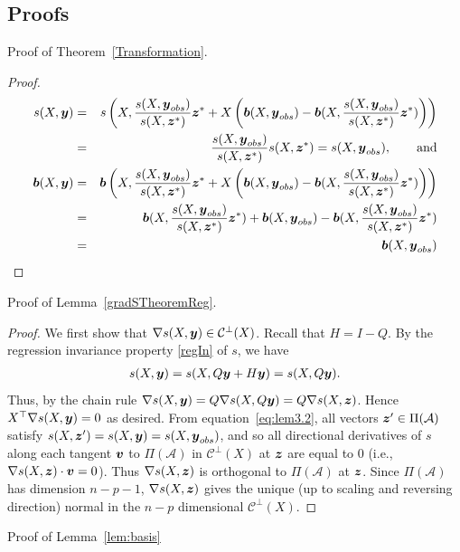 \documentclass[11pt]{article}
\newcommand{\by}{\mbox{\boldmath $y$}}
\newcommand{\bz}{\mbox{\boldmath $z$}}
\newcommand{\bv}{\mbox{\boldmath $v$}}
\newcommand{\bb}{\mbox{\boldmath $b$}}
\newcommand{\mc}{\mathcal}
\begin{document}
\subsection{Proofs}
\noindent

Proof of Theorem~\ref{Transformation}.  
\begin{proof} 
\begin{eqnarray}
 s(X,\by) & = & s\left(X,\frac{s(X,\by_{obs})}{s(X,\bz^*)}\bz^* + X\left(\bb(X,\by_{obs}) - \bb(X,\frac{s(X,\by_{obs})}{s(X,\bz^*)}\bz^*)\right)\right) \\
& = & \frac{s(X,\by_{obs})}{s(X,\bz^*)} s(X, \bz^*)= s(X,\by_{obs}) , \qquad \mbox{and} \\
 \bb(X,\by) & = & \bb\left(X,\frac{s(X,\by_{obs})}{s(X,\bz^*)}\bz^* + X\left(\bb(X,\by_{obs}) - \bb(X,\frac{s(X,\by_{obs})}{s(X,\bz^*)}\bz^*)\right)\right) \\
 & = & \bb(X,\frac{s(X,\by_{obs})}{s(X,\bz^*)}\bz^*) + \bb(X,\by_{obs}) - \bb(X,\frac{s(X,\by_{obs})}{s(X,\bz^*)}\bz^*) \\ &=& \bb(X,\by_{obs})
\end{eqnarray}
\end{proof}

\noindent
Proof of Lemma~\ref{gradSTheoremReg}.
\begin{proof}
We first show that $\nabla s(X,\by)\in \mc{C}^\perp(X)$. Recall that
$H=I-Q$. By the regression invariance property \ref{regIn} of $s$, we have
\label{perpGradReg}
\begin{equation}
\label{eq:lem3.2}
\begin{aligned}
s(X,\by)=s(X, Q\by+H\by)=s(X, Q\by).
\end{aligned}
\end{equation}
Thus, by the chain rule $\nabla s(X,\by)=Q\nabla s(X,Q\by)=Q\nabla s(X, \bz)$. Hence $X^\top \nabla s(X,\by)=0$ as desired.
From equation~\eqref{eq:lem3.2}, all vectors $\bz'\in \Pi(\mathcal{A})$ satisfy $s(X,\bz')=
s(X,\by)=s(X,\by_{obs})$, and so all directional derivatives of $s$ along each tangent $\bv$ to
  $\Pi(\mathcal{A})$ in $\mc C^\perp(X)$ at $\bz$ are equal to 0 (i.e., $\nabla s(X,\bz) \cdot \bv=0$).  Thus $\nabla s(X,\bz)$ is orthogonal to  $\Pi(\mathcal{A})$ at $\bz$.  
Since $\Pi(\mathcal{A})$ has dimension $n-p-1$, $\nabla s(X,\bz)$ gives the unique (up to scaling and reversing direction) normal in the $n-p$ dimensional $\mc C^\perp(X)$.  
\end{proof}

\noindent
Proof of Lemma~\ref{lem:basis}
\end{document}
